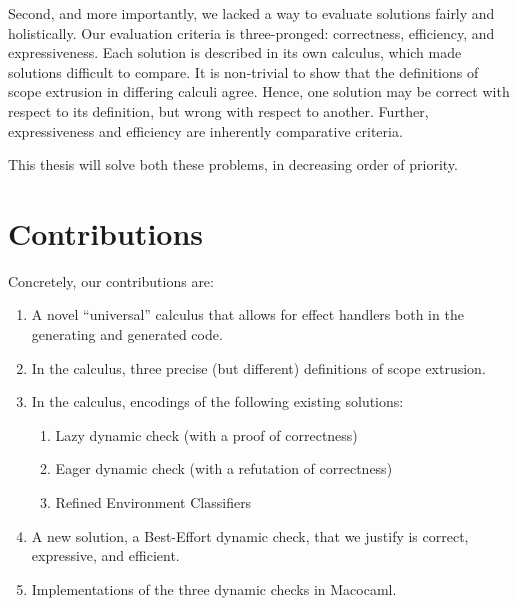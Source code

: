 Second, and more importantly, we lacked a way to evaluate solutions fairly and holistically. Our evaluation criteria is three-pronged: correctness, efficiency, and expressiveness. Each solution is described in its own calculus, which made solutions difficult to compare. It is non-trivial to show that the definitions of scope extrusion in differing calculi agree. Hence, one solution may be correct with respect to its definition, but wrong with respect to another. Further, expressiveness and efficiency are inherently comparative criteria.

This thesis will solve both these problems, in decreasing order of priority. 

\section{Contributions}
Concretely, our contributions are:
\begin{enumerate}
    \item A novel ``universal'' calculus that allows for effect handlers both in the generating and generated code.
    \item In the calculus, three precise (but different) definitions of scope extrusion.  
    \item In the calculus, encodings of the following existing solutions: 
    \begin{enumerate} 
        \item Lazy dynamic check (with a proof of correctness)
        \item Eager dynamic check (with a refutation of correctness)
        \item Refined Environment Classifiers
    \end{enumerate}
    \item A new solution, a Best-Effort dynamic check, that we justify is correct, expressive, and efficient.
    \item Implementations of the three dynamic checks in Macocaml.
\end{enumerate}